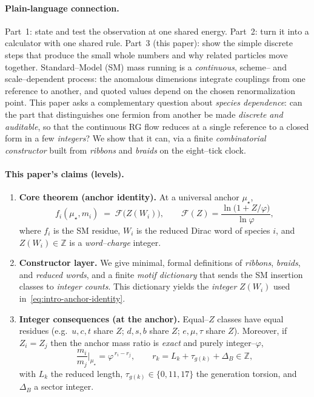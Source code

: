 \documentclass[epjc3]{svjour3}
\begin{document}
\paragraph{Plain-language connection.}
Part~1: state and test the observation at one shared energy. Part~2: turn it into a calculator with one shared rule. Part~3 (this paper): show the simple discrete steps that produce the small whole numbers and why related particles move together.
Standard--Model (SM) mass running is a \emph{continuous}, scheme-- and scale--dependent process: the anomalous dimensions integrate couplings from one reference to another, and quoted values depend on the chosen renormalization point. This paper asks a complementary question about \emph{species dependence}: can the part that distinguishes one fermion from another be made \emph{discrete and auditable}, so that the continuous RG flow reduces at a single reference to a closed form in a few \emph{integers}? We show that it can, via a finite \emph{combinatorial constructor} built from \emph{ribbons} and \emph{braids} on the eight--tick clock.

\paragraph{This paper's claims (levels).}
\begin{enumerate}
  \item \textbf{Core theorem (anchor identity).}  At a universal anchor $\mu_\star$,
  \begin{equation}
    f_i(\mu_\star,m_i)
    \;=\;
    \mathcal F\!\bigl(Z(W_i)\bigr),
    \qquad
    \mathcal F(Z)=\frac{\ln\!\bigl(1+Z/\varphi\bigr)}{\ln\varphi},
    \label{eq:intro-anchor-identity}
  \end{equation}
  where $f_i$ is the SM residue, $W_i$ is the reduced Dirac word of species $i$, and $Z(W_i)\in\mathbb Z$ is a \emph{word--charge} integer.
  \item \textbf{Constructor layer.}  We give minimal, formal definitions of \emph{ribbons}, \emph{braids}, and \emph{reduced words}, and a finite \emph{motif dictionary} that sends the SM insertion classes to \emph{integer counts}. This dictionary yields the \emph{integer} $Z(W_i)$ used in~\eqref{eq:intro-anchor-identity}.
  \item \textbf{Integer consequences (at the anchor).}  Equal--$Z$ classes have equal residues (e.g.\ $u,c,t$ share $Z$; $d,s,b$ share $Z$; $e,\mu,\tau$ share $Z$). Moreover, if $Z_i=Z_j$ then the anchor mass ratio is \emph{exact} and purely integer--$\varphi$,
  \begin{equation}
      \frac{m_i}{m_j}\Big|_{\mu_\star}=\varphi^{\,r_i-r_j},
      \qquad
      r_k=L_k+\tau_{g(k)}+\Delta_B\in\mathbb{Z},
      \label{eq:intro-anchor-ratio}
  \end{equation}
  with $L_k$ the reduced length, $\tau_{g(k)}\in\{0,11,17\}$ the generation torsion, and $\Delta_B$ a sector integer.
\end{enumerate}
\end{document}
